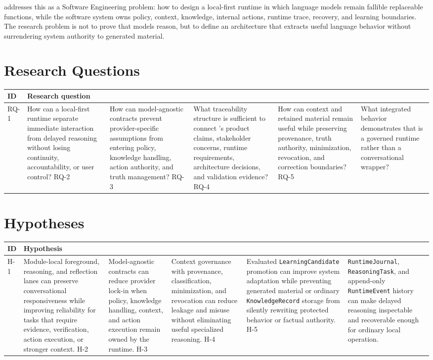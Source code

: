 \documentclass[11pt]{report}
\begin{document}
\Madre addresses this as a Software Engineering problem: how to design a local-first runtime in which language models remain fallible replaceable functions, while the software system owns policy, context, knowledge, internal actions, runtime trace, recovery, and learning boundaries. The research problem is not to prove that models reason, but to define an architecture that extracts useful language behavior without surrendering system authority to generated material.

\section{Research Questions}

\begin{tabularx}{.95\linewidth}{@{}lX@{}}
	\toprule
	\textbf{ID} & \textbf{Research question} \\
	\midrule
	RQ-1 & How can a local-first runtime separate immediate interaction from delayed reasoning without losing continuity, accountability, or user control? \n
	RQ-2 & How can model-agnostic contracts prevent provider-specific assumptions from entering policy, knowledge handling, action authority, and truth management? \n
	RQ-3 & What traceability structure is sufficient to connect \Madre's product claims, stakeholder concerns, runtime requirements, architecture decisions, and validation evidence? \n
	RQ-4 & How can context and retained material remain useful while preserving provenance, truth authority, minimization, revocation, and correction boundaries? \n
	RQ-5 & What integrated behavior demonstrates that \Madre is a governed runtime rather than a conversational wrapper? \n
	\bottomrule
\end{tabularx}

\section{Hypotheses}

\begin{tabularx}{.95\linewidth}{@{}lX@{}}
	\toprule
	\textbf{ID} & \textbf{Hypothesis} \\
	\midrule
	H-1 & Module-local foreground, reasoning, and reflection lanes can preserve conversational responsiveness while improving reliability for tasks that require evidence, verification, action execution, or stronger context. \n
	H-2 & Model-agnostic contracts can reduce provider lock-in when policy, knowledge handling, context, and action execution remain owned by the runtime. \n
	H-3 & Context governance with provenance, classification, minimization, and revocation can reduce leakage and misuse without eliminating useful specialized reasoning. \n
	H-4 & Evaluated \texttt{LearningCandidate} promotion can improve system adaptation while preventing generated material or ordinary \texttt{KnowledgeRecord} storage from silently rewriting protected behavior or factual authority. \n
	H-5 & \texttt{RuntimeJournal}, \texttt{ReasoningTask}, and append-only \texttt{RuntimeEvent} history can make delayed reasoning inspectable and recoverable enough for ordinary local operation. \n
	\bottomrule
\end{tabularx}
\end{document}
